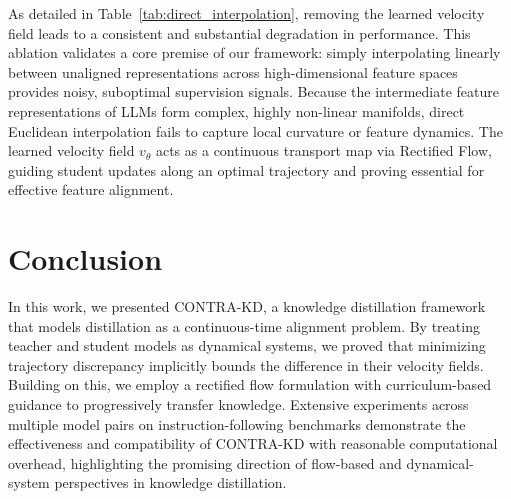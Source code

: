 \documentclass{article} %
\theoremstyle{definition}
\theoremstyle{remark}
\begin{document}
\begin{table}[htbp]
  \centering
  \caption{Comparison with direct linear interpolation without velocity field (GPT2 1.5B $\rightarrow$ 0.1B with DistiLLM objective). ROUGE-L scores (\%) are averaged over 5 seeds $\pm$ standard deviation.}
  \label{tab:direct_interpolation}
\end{table}

As detailed in Table~\ref{tab:direct_interpolation}, removing the learned velocity field leads to a consistent and substantial degradation in performance. This ablation validates a core premise of our framework: simply interpolating linearly between unaligned representations across high-dimensional feature spaces provides noisy, suboptimal supervision signals. Because the intermediate feature representations of LLMs form complex, highly non-linear manifolds, direct Euclidean interpolation fails to capture local curvature or feature dynamics. The learned velocity field $v_\theta$ acts as a continuous transport map via Rectified Flow, guiding student updates along an optimal trajectory and proving essential for effective feature alignment.

\section{Conclusion}
In this work, we presented CONTRA-KD, a knowledge distillation framework that models distillation as a continuous-time alignment problem. By treating teacher and student models as dynamical systems, we proved that minimizing trajectory discrepancy implicitly bounds the difference in their velocity fields. Building on this, we employ a rectified flow formulation with curriculum-based guidance to progressively transfer knowledge. Extensive experiments across multiple model pairs on instruction-following benchmarks demonstrate the effectiveness and compatibility of CONTRA-KD with reasonable computational overhead, highlighting the promising direction of flow-based and dynamical-system perspectives in knowledge distillation.
\end{document}
